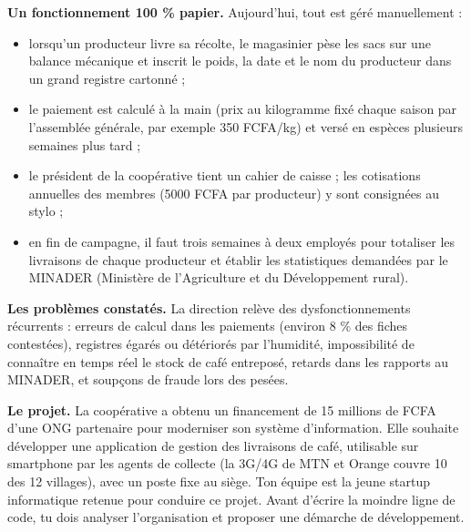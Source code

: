 \documentclass[11pt]{article}
\newcounter{popsec}
\newcounter{popsub}
\newcommand{\courssub}[1]{%
  \stepcounter{popsub}%
  \par\vspace{9pt}\noindent{\popxbold\fontsize{11.5}{13}\selectfont\color{popink}{\color{poporange}\thepopsec.\thepopsub}\hspace{6pt}#1}\par\nopagebreak\vspace{4pt}
}
\begin{document}
\textbf{Un fonctionnement 100 \% papier.} Aujourd'hui, tout est géré manuellement :

\begin{itemize}
\item lorsqu'un producteur livre sa récolte, le magasinier pèse les sacs sur une balance mécanique et inscrit le poids, la date et le nom du producteur dans un grand registre cartonné ;
\item le paiement est calculé à la main (prix au kilogramme fixé chaque saison par l'assemblée générale, par exemple \num{350} FCFA/kg) et versé en espèces plusieurs semaines plus tard ;
\item le président de la coopérative tient un cahier de caisse ; les cotisations annuelles des membres (\num{5 000} FCFA par producteur) y sont consignées au stylo ;
\item en fin de campagne, il faut trois semaines à deux employés pour totaliser les livraisons de chaque producteur et établir les statistiques demandées par le MINADER (Ministère de l'Agriculture et du Développement rural).
\end{itemize}

\textbf{Les problèmes constatés.} La direction relève des dysfonctionnements récurrents : erreurs de calcul dans les paiements (environ 8 \% des fiches contestées), registres égarés ou détériorés par l'humidité, impossibilité de connaître en temps réel le stock de café entreposé, retards dans les rapports au MINADER, et soupçons de fraude lors des pesées.

\textbf{Le projet.} La coopérative a obtenu un financement de 15 millions de FCFA d'une ONG partenaire pour moderniser son système d'information. Elle souhaite développer une application de gestion des livraisons de café, utilisable sur smartphone par les agents de collecte (la 3G/4G de MTN et Orange couvre 10 des 12 villages), avec un poste fixe au siège. Ton équipe est la jeune startup informatique retenue pour conduire ce projet. Avant d'écrire la moindre ligne de code, tu dois analyser l'organisation et proposer une démarche de développement.

\courssub{Consignes}
\end{document}
